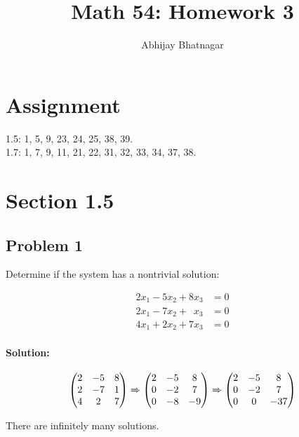 \documentclass[11pt, notitlepage]{report}
\makeatletter
\newenvironment{solution}{\paragraph{\small Solution:}}{\hfill}
\newcommand*{\toccontents}{\@starttoc{toc}}
\makeatother
\begin{document}
   \title{Math 54: Homework 3}
   \author{Abhijay Bhatnagar}
   \maketitle
   \toccontents



\setcounter{secnumdepth}{0} %
\section{Assignment}

1.5: 1, 5, 9, 23, 24, 25, 38, 39. \\
1.7: 1, 7, 9, 11, 21, 22, 31, 32, 33, 34, 37, 38.

\newpage
\section {Section 1.5}
\subsection{Problem 1}
Determine if the system has a nontrivial solution:

\begin{align*}
	2x_1-5x_2+8x_3 &= 0 \\
	2x_1-7x_2+\phantom{8}x_3 &= 0  \\
	4x_1+2x_2+7x_3 &= 0
\end{align*} 

\begin{solution}

\[
\left(\begin{matrix}{}
  2&-5 &8 \\
  2&-7 &1 \\
  4&2 &7
\end{matrix}\right)
%
\xRightarrow{}
%
\left(\begin{matrix}{}
  2&-5 &8 \\
  0&-2 &7 \\
  0&-8 &-9
\end{matrix}\right)
%
\xRightarrow{}
%
\left(\begin{matrix}{}
  2&-5 &8 \\
  0&-2 &7 \\
  0&0 &-37
\end{matrix}\right)
\]

There are infinitely many solutions.

\end{solution}
\end{document}
